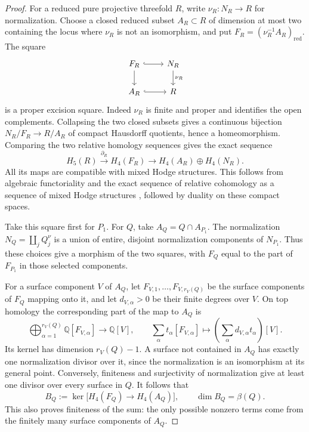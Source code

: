 \documentclass[11pt]{amsart}
\theoremstyle{definition}
\theoremstyle{remark}
\numberwithin{equation}{section}
\newcommand{\Q}{\mathbb{Q}}
\begin{document}
\begin{proof}
For a reduced pure projective threefold $R$, write
$\nu_R\colon N_R\to R$ for normalization.  Choose a closed reduced
subset $A_R\subset R$ of dimension at most two containing the locus
where $\nu_R$ is not an isomorphism, and put
$F_R=(\nu_R^{-1}A_R)_{\mathrm{red}}$.  The square
\[
\begin{tikzcd}
 F_R \arrow[r,hook] \arrow[d] & N_R \arrow[d,"\nu_R"]\\
 A_R \arrow[r,hook] & R
\end{tikzcd}
\]
is a proper excision square.  Indeed $\nu_R$ is finite and proper and
identifies the open complements.  Collapsing the two closed subsets
gives a continuous bijection $N_R/F_R\to R/A_R$ of compact Hausdorff
quotients, hence a homeomorphism.  Comparing the two relative homology
sequences gives the exact sequence
\begin{equation}\label{eq:branch-normalization-excision}
 H_5(R)\xrightarrow{\partial_R}H_4(F_R)
 \longrightarrow H_4(A_R)\oplus H_4(N_R).
\end{equation}
All its maps are compatible with mixed Hodge structures.  This follows
from algebraic functoriality and the exact sequence of relative
cohomology as a sequence of mixed Hodge structures
\cite[Propositions~8.2.2 and 8.3.9]{DeligneHodgeIII}, followed by
duality on these compact spaces.

Take this square first for $P_1$.  For $Q$, take
$A_Q=Q\cap A_{P_1}$.  The normalization
$N_Q=\coprod_jQ_j^\nu$ is a union of entire, disjoint normalization
components of $N_{P_1}$.  Thus these choices give a morphism of the
two squares, with $F_Q$ equal to the part of $F_{P_1}$ in those
selected components.

For a surface component $V$ of $A_Q$, let
$F_{V,1},\ldots,F_{V,r_V(Q)}$ be the surface components of $F_Q$
mapping onto it, and let $d_{V,\alpha}>0$ be their finite degrees over
$V$.  On top homology the corresponding part of the map to $A_Q$ is
\[
 \bigoplus_{\alpha=1}^{r_V(Q)}\Q[F_{V,\alpha}]
 \longrightarrow\Q[V],\qquad
 \sum_\alpha t_\alpha[F_{V,\alpha}]
 \longmapsto\left(\sum_\alpha d_{V,\alpha}t_\alpha\right)[V].
\]
Its kernel has dimension $r_V(Q)-1$.  A surface not contained in
$A_Q$ has exactly one normalization divisor over it, since the
normalization is an isomorphism at its general point.  Conversely,
finiteness and surjectivity of normalization give at least one divisor
over every surface in $Q$.  It follows that
\[
 B_Q:=\ker\bigl[H_4(F_Q)\longrightarrow H_4(A_Q)\bigr],
 \qquad \dim B_Q=\beta(Q).
\]
This also proves finiteness of the sum: the only possible nonzero
terms come from the finitely many surface components of $A_Q$.


\end{proof}
\end{document}
